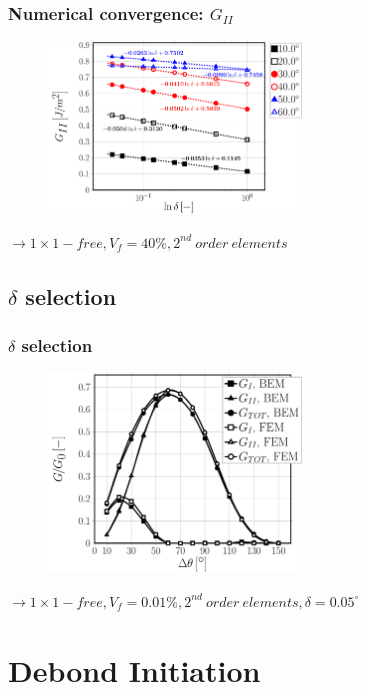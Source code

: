 \documentclass[first,firstsupp,lastsupp,last,hyperref,table]{ETHclass}
\begin{document}
\begin{frame}
\frametitle{\vspace{0.25cm}\small Numerical convergence: $G_{II}$}
\vspace{-.75cm}
\centering
\begin{figure}
\centering
\includegraphics[width=0.6\textwidth]{Vf40-free-2nd-semilogvsDelta-GII.pdf}
\end{figure}
$\rightarrow 1\times1-free, V_{f}=40\%, 2^{nd}\ order\ elements$ 
\end{frame}

\subsection{$\delta$ selection}

\begin{frame}
\frametitle{\vspace{0.25cm}\small $\delta$ selection}
\vspace{-.75cm}
\centering
\begin{figure}
\centering
\includegraphics[width=0.6\textwidth]{validation-VCCT.pdf}
\end{figure}
$\rightarrow 1\times1-free, V_{f}=0.01\%, 2^{nd}\ order\ elements,\delta=0.05^{\circ}$ 
\end{frame}

\section{Debond Initiation}
\end{document}
